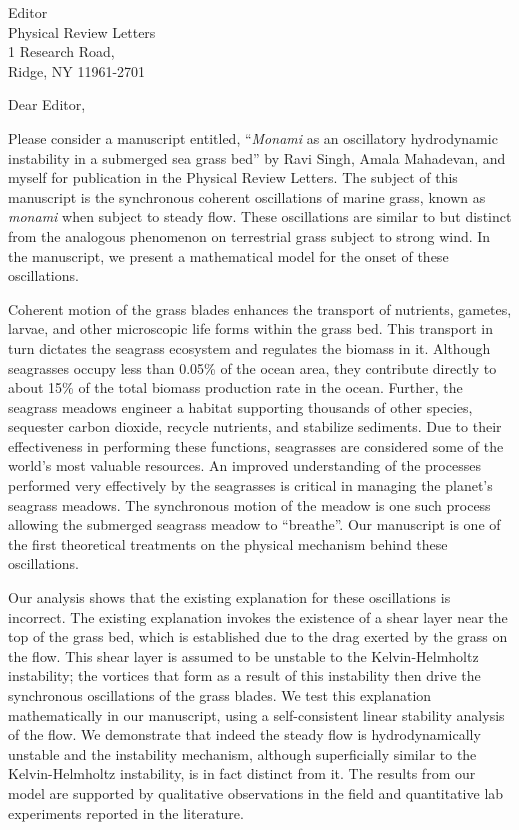 \documentclass[10pt]{letter}
\date{\today}
\begin{document}
\begin{letter}{
Editor \\
Physical Review Letters \\
1 Research Road, \\
Ridge, NY 11961-2701 
}
\opening{Dear Editor,}

Please consider a manuscript entitled, ``{\it Monami} as an oscillatory hydrodynamic instability in a submerged sea grass bed'' by Ravi Singh, Amala Mahadevan, and myself for publication in the Physical Review Letters. The subject of this manuscript is the synchronous coherent oscillations of marine grass, known as {\it monami} when subject to steady flow. These oscillations are similar to but distinct from the analogous phenomenon on terrestrial grass subject to strong wind. In the manuscript, we present a mathematical model for the onset of these oscillations.

Coherent motion of the grass blades enhances the transport of nutrients, gametes, larvae, and other microscopic life forms within the grass bed. This transport in turn dictates the seagrass ecosystem and regulates the biomass in it. Although seagrasses occupy less than 0.05\% of the ocean area, they contribute directly to about 15\% of the total biomass production rate in the ocean. Further, the seagrass meadows engineer a habitat supporting thousands of other species, sequester carbon dioxide, recycle nutrients, and stabilize sediments. Due to their effectiveness in performing these functions, seagrasses are considered some of the world's most valuable resources. An improved understanding of the processes performed very effectively by the seagrasses is critical in managing the planet's seagrass meadows. The synchronous motion of the meadow is one such process allowing the submerged seagrass meadow to ``breathe''. Our manuscript is one of the first theoretical treatments on the physical mechanism behind these oscillations. 

Our analysis shows that the existing explanation for these oscillations is incorrect. The existing explanation invokes the existence of a shear layer near the top of the grass bed, which is established due to the drag exerted by the grass on the flow. This shear layer is assumed to be unstable to the Kelvin-Helmholtz instability; the vortices that form as a result of this instability then drive the synchronous oscillations of the grass blades. We test this explanation mathematically in our manuscript, using a self-consistent linear stability analysis of the flow. We demonstrate that indeed the steady flow is hydrodynamically unstable and the instability mechanism, although superficially similar to the Kelvin-Helmholtz instability, is in fact distinct from it. The results from our model are supported by qualitative observations in the field and quantitative lab experiments reported in the literature.


\end{letter}
\end{document}
